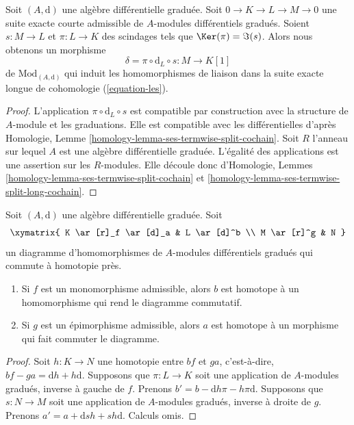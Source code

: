 \begin{lemma}
\label{lemma-admissible-ses}
Soit $(A, \text{d})$ une algèbre différentielle graduée. Soit $0 \to K \to L \to M
\to 0$ une suite exacte courte admissible de $A$-modules différentiels gradués.
Soient $s : M \to L$ et $\pi : L \to K$ des scindages tels que $\Ker(\pi) =
\Im(s)$. Alors nous obtenons un morphisme
$$
\delta = \pi \circ \text{d}_L \circ s : M \to K[1]
$$
de $\text{Mod}_{(A, \text{d})}$ qui induit les homomorphismes de liaison dans la
suite exacte longue de cohomologie (\ref{equation-les}).
\end{lemma}

\begin{proof}
L'application $\pi \circ \text{d}_L \circ s$ est compatible par construction avec
la structure de $A$-module et les graduations. Elle est compatible avec les
différentielles d'après Homologie, Lemme
\ref{homology-lemma-ses-termwise-split-cochain}. Soit $R$ l'anneau sur lequel $A$
est une algèbre différentielle graduée. L'égalité des applications est une
assertion sur les $R$-modules. Elle découle donc d'Homologie,
Lemmes \ref{homology-lemma-ses-termwise-split-cochain} et
\ref{homology-lemma-ses-termwise-split-long-cochain}.
\end{proof}

\begin{lemma}
\label{lemma-make-commute-map}
Soit $(A, \text{d})$ une algèbre différentielle graduée. Soit
$$
\xymatrix{
K \ar[r]_f \ar[d]_a & L \ar[d]^b \\
M \ar[r]^g & N
}
$$
un diagramme d'homomorphismes de $A$-modules différentiels gradués qui commute à
homotopie près.
\begin{enumerate}
\item Si $f$ est un monomorphisme admissible, alors $b$ est homotope à un
homomorphisme qui rend le diagramme commutatif.
\item Si $g$ est un épimorphisme admissible, alors $a$ est homotope à un morphisme
qui fait commuter le diagramme.
\end{enumerate}
\end{lemma}

\begin{proof}
Soit $h : K \to N$ une homotopie entre $bf$ et $ga$, c’est-à-dire, $bf - ga =
\text{d}h + h\text{d}$. Supposons que $\pi : L \to K$ soit une application de
$A$-modules gradués, inverse à gauche de $f$. Prenons $b' = b - \text{d}h\pi - h\pi
\text{d}$. Supposons que $s : N \to M$ soit une application de $A$-modules
gradués, inverse à droite de $g$. Prenons $a' = a + \text{d}sh + sh\text{d}$.
Calculs omis.
\end{proof}


